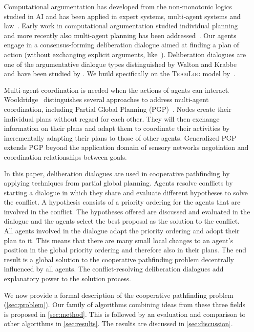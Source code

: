 Computational argumentation has developed from the non-monotonic logics studied 
in AI and has been applied in expert 
systems, multi-agent systems and law~\cite{vanEemerenEtal2014ch11}. Early work in 
computational argumentation studied individual planning~\cite{pollock1995} and 
more recently also multi-agent planning has been 
addressed~\cite{ferrando2012,pardo2011}. Our agents engage in a 
consensus-forming deliberation
dialogue aimed at finding a plan of action (without exchanging explicit 
arguments, like~\cite{black2011}). Deliberation dialogues are one of 
the argumentative dialogue types distinguished by Walton and 
Krabbe~\cite{walton1995} and have been studied by 
\cite{mcburney2007,walton2014}. We build specifically on the \textsc{TeamLog} 
model by~\cite{dunin-keplicz2011}.

Multi-agent coordination is needed when the actions of agents can interact.
Wooldridge~\cite[pp.~202--204]{wooldridge2009} distinguishes several 
approaches to address multi-agent coordination, including Partial Global 
Planning (PGP)~\cite{durfee1991}. Nodes create their individual plans without 
regard for each other. They will then exchange information on their plans and
adapt them to coordinate their activities by incrementally 
adapting their plans to those of other agents.
Generalized PGP \cite{decker1992} extends PGP beyond the application domain of sensory networks %
negotiation and coordination relationships between goals. 

In this paper, deliberation dialogues are used in cooperative pathfinding by applying techniques from
partial global planning. Agents resolve conflicts by starting a dialogue in
which they share and evaluate different hypotheses to solve the conflict. A
hypothesis consists of a priority ordering for the agents that are involved in
the conflict. The hypotheses offered are discussed and evaluated in the
dialogue and the agents select the best proposal as the solution
to the conflict. All agents involved in the dialogue adapt the priority
ordering and adopt their plan to it. This means that there are many small local
changes to an agent's position in the global priority ordering and therefore also in
their plans. The end result is a global solution to the cooperative pathfinding
problem decentrally influenced by all agents. The conflict-resolving deliberation dialogues add explanatory power to the solution process.

We now provide a formal description of the cooperative pathfinding problem 
(\autoref{sec:problem}). Our family 
of algorithms combining ideas from these three fields is proposed in 
\autoref{sec:method}. This is followed by an evaluation and comparison to other 
algorithms in \autoref{sec:results}. The results are discussed in 
\autoref{sec:discussion}.

